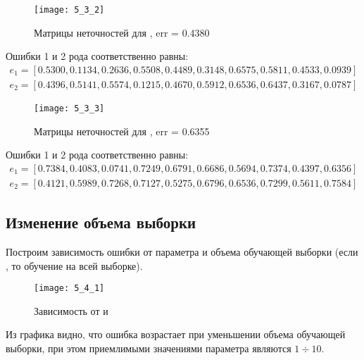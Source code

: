 \begin{figure}[H]
\begin{center}
	\texttt{[image: 5\_3\_2]}
	\caption{Матрицы неточностей для , err = 0.4380}
	\label{fig:5_3_2}
\end{center}
\end{figure}
Ошибки 1 и 2 рода соответственно равны:
\begin{gather*}
e_1 = [0.5300, 0.1134, 0.2636, 0.5508, 0.4489, 0.3148, 0.6575, 0.5811, 0.4533, 0.0939]\\
e_2 = [0.4396, 0.5141, 0.5574, 0.1215, 0.4670, 0.5912, 0.6536, 0.6437, 0.3167, 0.0787]
\end{gather*}

\begin{figure}[H]
\begin{center}
	\texttt{[image: 5\_3\_3]}
	\caption{Матрицы неточностей для , err = 0.6355}
	\label{fig:5_3_3}
\end{center}
\end{figure}
Ошибки 1 и 2 рода соответственно равны:
\begin{gather*}
e_1 = [0.7384, 0.4083, 0.0741, 0.7249, 0.6791, 0.6686, 0.5694, 0.7374, 0.4397, 0.6356]\\
e_2 = [0.4121, 0.5989, 0.7268, 0.7127, 0.5275, 0.6796, 0.6536, 0.7299, 0.5611, 0.7584]
\end{gather*}

\subsection{Изменение объема выборки}


Построим зависимость ошибки  от параметра  и объема обучающей выборки  (если , то обучение на всей выборке). 
\begin{figure}[H]
\begin{center}
	\texttt{[image: 5\_4\_1]}
	\caption{Зависимость  от  и }
	\label{fig:5_4_1}
\end{center}
\end{figure}
Из графика видно, что ошибка возрастает при уменьшении объема обучающей выборки, при этом приемлимыми значениями параметра  являются $1 \div 10$.

